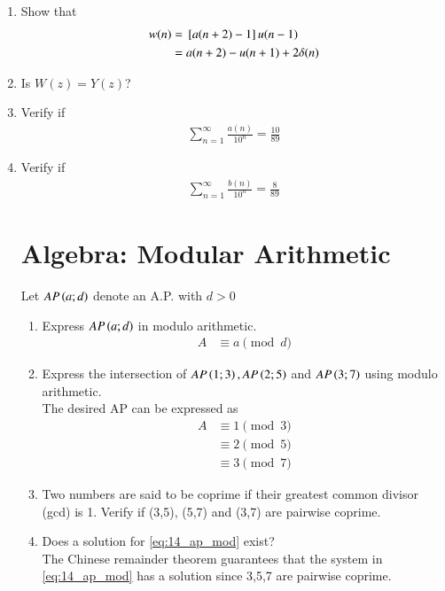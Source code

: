 \documentclass[journal,12pt,twocolumn]{IEEEtran}
\renewcommand\thesection{\arabic{section}}
\begin{document}
\begin{enumerate}[label=\thesection.\arabic*
,ref=\thesection.\theenumi]
\begin{align}
&= \frac{z^{-1}}{\brak{1- z^{-1}-z^{-2}}\brak{1- z^{-1}}}
\end{align}
\item Show that 
\begin{align}
w(n)&={}\left[a(n+2)-1\right]u(n-1)
\\
&=a(n+2)-u(n+1)+2\delta(n)
\end{align}
\item Is $W(z)=Y(z)$?
\item Verify if 
\begin{align}
\sum_{n=1}^{\infty}\frac{a(n)}{10^n} = \frac{10}{89}
\end{align}
\item Verify if 
\begin{align}
\sum_{n=1}^{\infty}\frac{b(n)}{10^n} = \frac{8}{89}
\end{align}
\section{Algebra: Modular Arithmetic}
Let $AP\left(a;d\right)$ denote an A.P. with $d > 0$
\begin{enumerate}[label=\thesection.\arabic*
,ref=\thesection.\theenumi]
\item Express $AP\left(a;d\right)$ in modulo arithmetic.
\\
\solution 
\begin{align}
\label{eq:14_ap_mod_def}
A &\equiv a\pmod{d}
\end{align}
\item Express the intersection of $AP\left(1;3\right), AP\left(2;5\right)$ and $AP\left(3;7\right)$  using modulo arithmetic.
\\
\solution The desired AP can be expressed as
\begin{align}
\label{eq:14_ap_mod}
A &\equiv 1\pmod{3}
\\
& \equiv 2\pmod {5}
\\
&\equiv 3\pmod{7}
\end{align}
%
\item Two numbers are said to be coprime if their greatest common divisor (gcd) is 1. Verify if (3,5), (5,7) and (3,7) are pairwise coprime.
\item Does a solution for \eqref{eq:14_ap_mod} exist?
\\
\solution  The Chinese remainder theorem guarantees that the system in \eqref{eq:14_ap_mod} has a solution since 3,5,7 are pairwise coprime.

\end{enumerate}
\end{enumerate}
\end{document}
